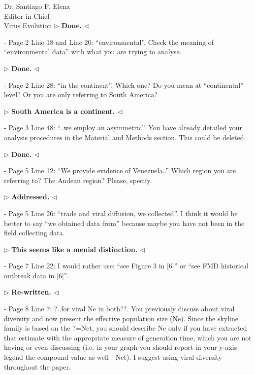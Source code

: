 \documentclass[ucla,biomath,12pt,noaddrfooter,datefrom]{UC_letter}
\newenvironment{reply}{$\triangleright$\bf}{$\triangleleft$}
\begin{document}
\begin{letter}{
Dr. Santiago F. Elena \\
Editor-in-Chief \\
Virus Evolution
}
\begin{reply}
Done.
\end{reply}

-       Page 2 Line 18 and Line 20: ``environmental''. 
Check the meaning of ``environmental data'' with what you are trying to analyse.

\begin{reply}
Done.
\end{reply}

-       Page 2 Line 28: ``in the continent''. 
Which one? 
Do you mean at ``continental'' level? 
Or you are only referring to South America?

\begin{reply}
South America is a continent.
\end{reply}

-       Page 3 Line 48: ``..we employ an asymmetric''. 
You have already detailed your analysis procedures in the Material and Methods section. 
This could be deleted.

\begin{reply}
Done.
\end{reply}

-       Page 5 Line 12: ``We provide evidence of Venezuela..'' 
Which region you are referring to? 
The Andean region? 
Please, specify.

\begin{reply}
Addressed.
\end{reply}

-       Page 5 Line 26: ``trade and viral diffusion, we collected''. 
I think it would be better to say ``we obtained data from'' because maybe you have not been in the field collecting data.

\begin{reply}
This seems like a menial distinction.
\end{reply}

-       Page 7 Line 22: I would rather use: ``see Figure 3 in [6]'' or ``see FMD historical outbreak data in [6]''.

\begin{reply}
Re-written.
\end{reply}

-       Page 8 Line 7: ?..for viral Ne in both??. 
You previously discuss about viral diversity and now present the effective population size (Ne). 
Since the skyline family is based on the ?=Net, you should describe Ne only if you have extracted that estimate with the appropriate measure of generation time, which you are not having or even discussing (i.e. in your graph you should report in your y-axis legend the compound value as well - Net). 
I suggest using viral diversity throughout the paper.


\end{letter}
\end{document}
